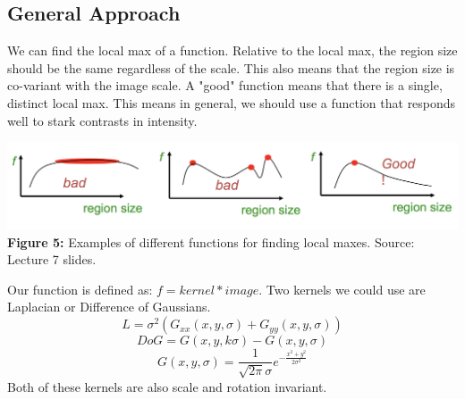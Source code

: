 \documentclass{article}
\begin{document}
\subsection{General Approach}
We can find the local max of a function. Relative to the local max, the region size should be the same regardless of the scale. This also means that the region size is co-variant with the image scale. A "good" function means that there is a single, distinct local max. This means in general, we should use a function that responds well to stark contrasts in intensity. \\
\begin{center}
	\includegraphics[scale=0.5]{scaleinvariant.png}\\
    \textbf{Figure 5:} Examples of different functions for finding local maxes. Source: Lecture 7 slides.
\end{center}
Our function is defined as: $f = kernel*image$. Two kernels we could use are Laplacian or Difference of Gaussians. $$L = \sigma^2(G_{xx}(x,y,\sigma)+G_{yy}(x,y,\sigma))$$ $$DoG = G(x,y,k\sigma) - G(x,y,\sigma)$$ $$G(x,y,\sigma) = \frac{1}{\sqrt{2\pi}\sigma}e^{-\frac{x^2+y^2}{2\sigma^2}}$$
Both of these kernels are also scale and rotation invariant.




\small


\end{document}
